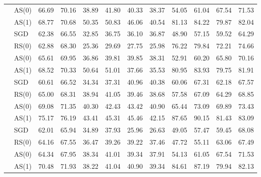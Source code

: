 \begin{table}[ht]
\begin{tabular}{@{}l l r r r r r r r r r r@{}}
 & AS(0) & 66.69 & 70.16 & 38.89 & 41.80 & 40.33 & 38.37 & 54.05 & 61.04 & 67.54 & 71.53 \\
 & AS(1) & 68.77 & 70.68 & 50.35 & 50.83 & 46.06 & 40.54 & 81.13 & 84.22 & 79.87 & 82.04 \\
\addlinespace[3pt]
\multirow{4}{*}{\textbf{OLoRA}} & SGD & 62.38 & 66.55 & 32.85 & 36.75 & 36.10 & 36.87 & 48.90 & 57.15 & 59.52 & 64.29 \\
 & RS(0) & 62.88 & 68.30 & 25.36 & 29.69 & 27.75 & 25.98 & 76.22 & 79.84 & 72.21 & 74.66 \\
 & AS(0) & 65.61 & 69.95 & 36.86 & 39.81 & 39.85 & 38.31 & 52.91 & 60.20 & 65.80 & 70.16 \\
 & AS(1) & 68.52 & 70.33 & 50.64 & 51.01 & 37.66 & 35.53 & 80.95 & 83.93 & 79.75 & 81.91 \\
\addlinespace[3pt]
\multirow{4}{*}{\textbf{InfLoRA}} & SGD & 60.61 & 66.52 & 34.34 & 37.31 & 40.96 & 40.38 & 60.06 & 67.31 & 62.18 & 67.57 \\
 & RS(0) & 65.00 & 68.31 & 38.94 & 41.05 & 39.46 & 38.68 & 57.58 & 67.09 & 64.29 & 68.85 \\
 & AS(0) & 69.08 & 71.35 & 40.30 & 42.43 & 43.42 & 40.90 & 65.44 & 73.09 & 69.89 & 73.43 \\
 & AS(1) & 75.17 & 76.19 & 43.41 & 45.31 & 45.46 & 42.15 & 87.65 & 90.15 & 81.43 & 83.09 \\
\addlinespace[3pt]
\multirow{4}{*}{\textbf{SDLoRA}} & SGD & 62.01 & 65.94 & 34.89 & 37.93 & 25.96 & 26.63 & 49.05 & 57.47 & 59.45 & 68.08 \\
 & RS(0) & 64.16 & 67.55 & 36.47 & 39.26 & 39.22 & 37.46 & 47.72 & 55.11 & 63.06 & 67.49 \\
 & AS(0) & 64.34 & 67.95 & 38.34 & 41.01 & 39.34 & 37.91 & 54.13 & 61.05 & 67.54 & 71.53 \\
 & AS(1) & 70.48 & 71.93 & 38.22 & 41.04 & 40.90 & 39.34 & 84.61 & 87.19 & 79.94 & 82.13 \\
\bottomrule
\end{tabular}
\end{table}